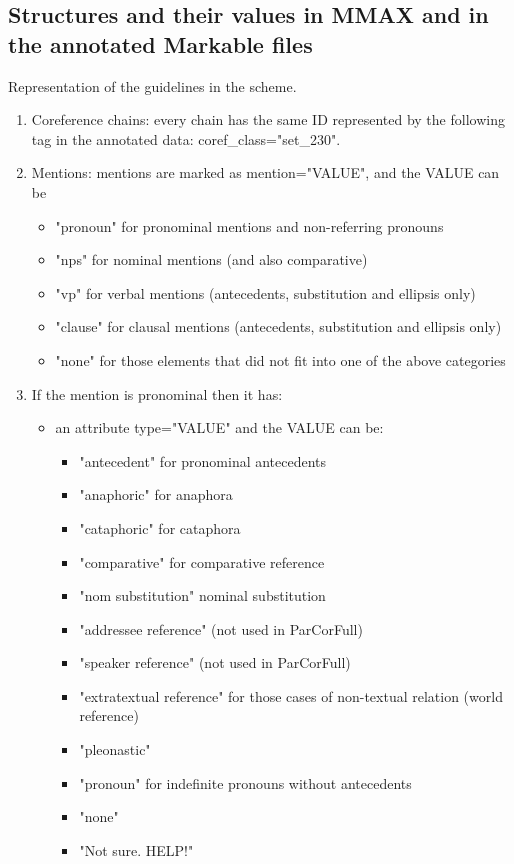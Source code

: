 \documentclass[a4paper]{article}
\begin{document}
\subsection{Structures and their values in MMAX and in the annotated Markable files}
Representation of the guidelines in the scheme.

\begin{enumerate}

\item Coreference chains: every chain has the same ID represented by the following tag in the annotated data: coref\_class="set\_230".

\item Mentions: mentions are marked as mention="VALUE", and the VALUE can be 
\begin{itemize}
\item "pronoun" for pronominal mentions and non-referring pronouns
\item "nps" for nominal mentions (and also comparative)
\item "vp" for verbal mentions (antecedents, substitution and ellipsis  only)
\item "clause" for clausal mentions (antecedents, substitution and ellipsis  only)
\item "none" for those elements that did not fit into one of the above categories 
\end{itemize}

\item If the mention is pronominal then it has:
\begin{itemize}
\item  an attribute type="VALUE" and the VALUE can be:
\begin{itemize}
\item "antecedent" for pronominal antecedents 
\item "anaphoric" for anaphora
\item "cataphoric" for cataphora
\item "comparative" for comparative reference
\item"nom substitution" nominal substitution
\item "addressee reference" (not used in ParCorFull)
\item "speaker reference"  (not used in ParCorFull)
\item "extratextual reference" for those cases of non-textual relation (world reference)
\item "pleonastic"
\item "pronoun" for indefinite pronouns without antecedents
\item "none"
 \item "Not sure. HELP!"
 \end{itemize}
 

\end{itemize}
\end{enumerate}
\end{document}
